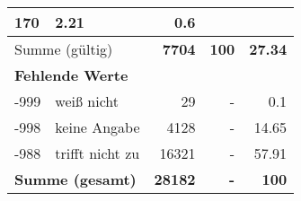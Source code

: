 \begin{longtable}{lXrrr}
       \num{170} &
       \num[round-mode=places,round-precision=2]{2.21} &
         \num[round-mode=places,round-precision=2]{0.6} \\
     \midrule
     \multicolumn{2}{l}{Summe (gültig)} &
       \textbf{\num{7704}} &
     \textbf{\num{100}} &
       \textbf{\num[round-mode=places,round-precision=2]{27.34}} \\
     \multicolumn{5}{l}{\textbf{Fehlende Werte}}\\
       -999 &
       weiß nicht &
         \num{29} &
        - &
         \num[round-mode=places,round-precision=2]{0.1} \\
       -998 &
       keine Angabe &
         \num{4128} &
        - &
         \num[round-mode=places,round-precision=2]{14.65} \\
       -988 &
       trifft nicht zu &
         \num{16321} &
        - &
         \num[round-mode=places,round-precision=2]{57.91} \\
     \midrule
     \multicolumn{2}{l}{\textbf{Summe (gesamt)}} &
          \textbf{\num{28182}} &
        \textbf{-} &
        \textbf{\num{100}} \\
     \bottomrule
     \end{longtable}
     
